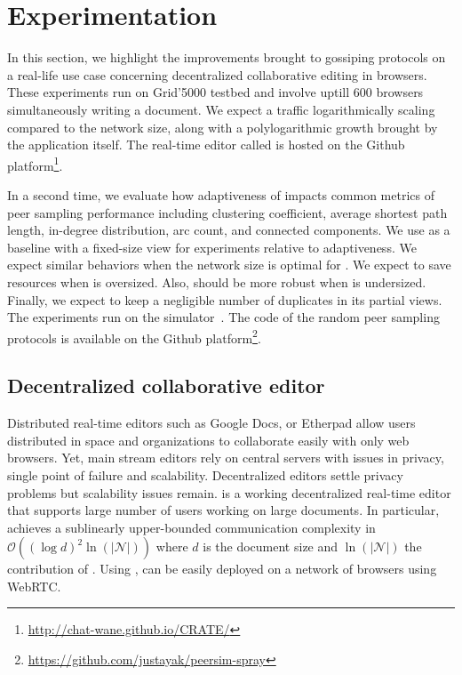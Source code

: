 \section{Experimentation}
\label{sec:experiments}

In this section, we highlight the improvements brought to gossiping protocols on
a real-life use case concerning decentralized collaborative editing in browsers.
These experiments run on Grid'5000 testbed and involve uptill 600 browsers
simultaneously writing a document. We expect a traffic logarithmically scaling
compared to the network size, along with a polylogarithmic growth brought by the
application itself. The real-time editor called \CRATE is hosted on the Github
platform\footnote{\url{http://chat-wane.github.io/CRATE/}}.

In a second time, we evaluate how adaptiveness of \SPRAY impacts common metrics
of peer sampling performance including clustering coefficient, average shortest
path length, in-degree distribution, arc count, and connected components. We use
\CYCLON as a baseline with a fixed-size view for experiments relative to
adaptiveness. We expect similar behaviors when the network size is optimal for
\CYCLON. We expect \SPRAY to save resources when \CYCLON is oversized. Also,
\SPRAY should be more robust when \CYCLON is undersized. Finally, we expect
\SPRAY to keep a negligible number of duplicates in its partial views. The
experiments run on the \PEERSIM simulator~\cite{montresor2009peersim}. The code
of the random peer sampling protocols is available on the Github
platform\footnote{\url{https://github.com/justayak/peersim-spray}}.


\subsection{Decentralized collaborative editor}
\label{subsec:editor}

Distributed real-time editors such as Google Docs, or Etherpad allow users
distributed in space and organizations to collaborate easily with only web
browsers. Yet, main stream editors rely on central servers with issues in
privacy, single point of failure and scalability.  Decentralized editors settle
privacy problems but scalability issues remain.  
\CRATE is a working decentralized real-time editor that supports large number of
users working on large documents. In particular, \CRATE achieves a sublinearly
upper-bounded communication complexity in
$\mathcal{O}((\log d)^2\ln(|\mathcal{N}|))$ where $d$ is the document size and
$\ln(|\mathcal{N}|)$ the contribution of \SPRAY. Using \SPRAY, \CRATE can be
easily deployed on a network of browsers using WebRTC.

